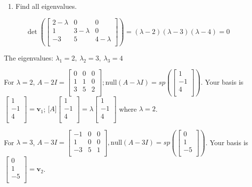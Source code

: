 \documentclass[12pt]{article}
\theoremstyle{plain}
\theoremstyle{remark}
\theoremstyle{definition}
\begin{document}
\begin{enumerate}
\def\labelenumi{\arabic{enumi}.}
\item
  Find all eigenvalues.
\end{enumerate}

\[\det\left( \begin{bmatrix}
2 - \lambda & 0 & 0 \\
1 & 3 - \lambda & 0 \\
 - 3 & 5 & 4 - \lambda \\
\end{bmatrix} \right) = (\lambda - 2)(\lambda - 3)(\lambda - 4) = 0\]

The eigenvalues: \(\lambda_{1} = 2,\ \lambda_{2} = 3,\ \lambda_{3} = 4\)

For \(\lambda = 2\), \(A - 2I = \begin{bmatrix}
0 & 0 & 0 \\
1 & 1 & 0 \\
3 & 5 & 2 \\
\end{bmatrix};\text{null}(A - \lambda I) = sp\left( \begin{bmatrix}
1 \\
 - 1 \\
4 \\
\end{bmatrix} \right)\). Your basis is\(\begin{bmatrix}
1 \\
 - 1 \\
4 \\
\end{bmatrix} = {\mathbf{v}}_{1}\);
\(\lbrack A\rbrack\begin{bmatrix}
1 \\
 - 1 \\
4 \\
\end{bmatrix} = \lambda\begin{bmatrix}
1 \\
 - 1 \\
4 \\
\end{bmatrix}\) where \(\lambda = 2\).

For \(\lambda = 3\), \(A - 3I = \begin{bmatrix}
 - 1 & 0 & 0 \\
1 & 0 & 0 \\
 - 3 & 5 & 1 \\
\end{bmatrix},\text{null}(A - 3I) = sp\left( \begin{bmatrix}
0 \\
1 \\
 - 5 \\
\end{bmatrix} \right)\). Your basis is \(\begin{bmatrix}
0 \\
1 \\
 - 5 \\
\end{bmatrix} = {\mathbf{v}}_{2}\).
\end{document}
